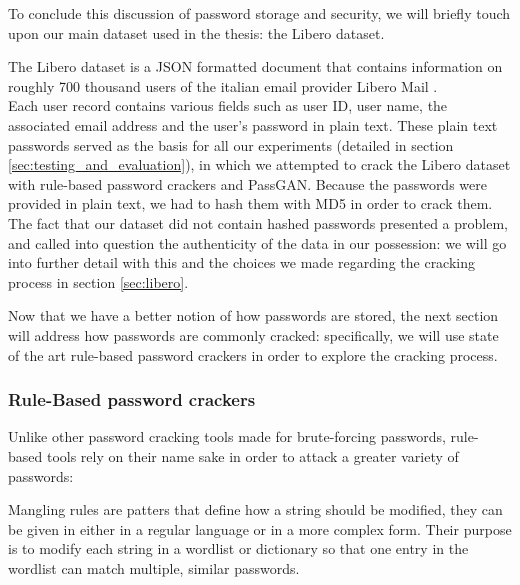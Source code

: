 To conclude this discussion of password storage and security, we will briefly touch upon our main dataset used in the thesis: the Libero dataset.

The Libero dataset is a JSON formatted document that contains information on roughly 700 thousand users of the italian email provider Libero Mail \cite{libero_leak}.\\
Each user record contains various fields such as  user ID, user name, the associated email address and the user's password in plain text.
These plain text passwords served as the basis for all our experiments (detailed in section \ref{sec:testing_and_evaluation}), in which we attempted to crack the Libero dataset with rule-based password crackers and PassGAN. Because the passwords were provided in plain text, we had to hash them with MD5 in order to crack them.
The fact that our dataset did not contain hashed passwords presented a problem, and called into question the authenticity of the data in our possession: we will go into further detail with this  and the choices we made regarding the cracking process in section \ref{sec:libero}.  

Now that we have a better notion of how passwords are stored, the next section will address how passwords are commonly cracked: specifically, we will use state of the art rule-based password crackers in order to explore the cracking process. %


\subsubsection{Rule-Based password crackers} \label{hash_and_jtr}
Unlike other password cracking tools made for brute-forcing passwords, rule-based tools rely on their name sake in order to attack a greater variety of passwords:

Mangling rules are patters that define how a string should be modified, they can be given in either in a regular language or in a more complex form.
Their purpose is to modify each string in a wordlist or dictionary so that one entry in the wordlist can match multiple, similar passwords.\\

